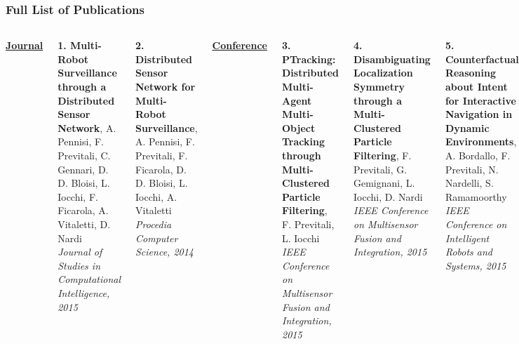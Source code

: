 \begin{frame}
	\frametitle{Full List of Publications}
	
	\vspace{-0.2cm}
	
	\begin{columns}[t]
		
		\tiny
		
		\textbf{\underline{Journal}}
		
		\vspace{0.1cm}
		
		\textbf{1. Multi-Robot Surveillance through a Distributed Sensor Network}, A. Pennisi, F.
		Previtali, C. Gennari, D. D. Bloisi, L. Iocchi, F. Ficarola, A. Vitaletti, D. Nardi \\
		\emph{Journal of Studies in Computational Intelligence, 2015}
		
		\vspace{0.15cm}
		
		\textbf{2. Distributed Sensor Network for Multi-Robot Surveillance}, A. Pennisi, F. Previtali,
		F. Ficarola, D. D. Bloisi, L. Iocchi, A. Vitaletti \\
		\emph{Procedia Computer Science, 2014}
		
		\vspace{0.2cm}
		
		\textbf{\underline{Conference}}
		
		\vspace{0.1cm}
		
		\textbf{3. PTracking: Distributed Multi-Agent Multi-Object Tracking through Multi-Clustered
		Particle Filtering}, F. Previtali, L. Iocchi \\
		\emph{IEEE Conference on Multisensor Fusion and Integration, 2015}
		
		\vspace{0.15cm}
		
		\textbf{4. Disambiguating Localization Symmetry through a Multi-Clustered Particle Filtering},
		F. Previtali, G. Gemignani, L. Iocchi, D. Nardi \\
		\emph{IEEE Conference on Multisensor Fusion and Integration, 2015}
		
		\vspace{0.15cm}
		
		\textbf{5. Counterfactual Reasoning about Intent for Interactive Navigation in Dynamic
		Environments}, A. Bordallo, F. Previtali, N. Nardelli, S. Ramamoorthy \\
		\emph{IEEE Conference on Intelligent Robots and Systems, 2015}
		

\end{columns}
\end{frame}
